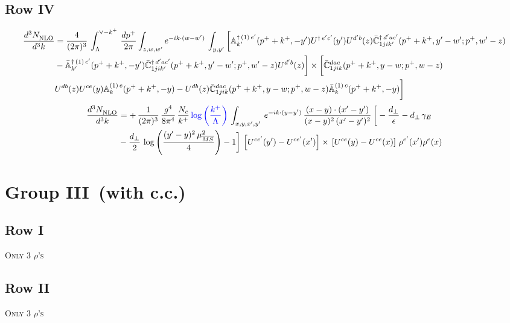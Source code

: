 \documentclass[9pt]{article}
\def\mf#1{\mathbb{#1}}
\numberwithin{equation}{section}
\begin{document}
\subsection{Row IV}
\begin{align}
    \frac{d^{3}N_{\rm NLO}^{\rm}}{d^{3}k}  & = \frac{4}{(2\pi)^{3}}\,\int_{\Lambda}^{\vee-k^{+}}\, \frac{dp^{+}}{2\pi}\int_{z,w,w^{\prime}} e^{-ik\cdot (w-w')}\,  \int_{y,y^{\prime}}\bigg[\mf{A}^{\dagger\, (1)\,e^{\prime}}_{k^{\prime}}(p^{+}+k^{+},-y^{\prime})U^{\dagger\, e^{\prime}c^{\prime}}(y^{\prime})U^{d^{\prime}b}(z) \Bar{\mf{C}}^{\dagger\, d^{\prime}ac^{\prime}}_{1jik^{\prime}}(p^{+}+k^{+},y^{\prime}-w^{\prime}; p^{+},w^{\prime}-z) \notag \\ &  -\Bar{\mf{A}}^{\dagger\, (1)\,c^{\prime}}_{k^{\prime}}(p^{+}+k^{+},-y^{\prime}) \Bar{\mf{C}}^{\dagger\, d^{\prime}ac^{\prime}}_{1jik^{\prime}}(p^{+}+k^{+},y^{\prime}-w^{\prime}; p^{+},w^{\prime}-z)U^{d^{\prime}b}(z)\bigg]\times\bigg[\Bar{\mf{C}}^{dac}_{1jik}(p^{+}+k^{+},y-w; p^{+},w-z)\notag \\ & U^{db}(z)U^{ce}(y) \mf{A}^{(1)\,e}_{k}(p^{+}+k^{+},-y) -U^{db}(z) \Bar{\mf{C}}^{dac}_{1jik}(p^{+}+k^{+},y-w; p^{+},w-z)\Bar{\mf{A}}^{(1)\,c}_{k}(p^{+}+k^{+},-y)\bigg]\nonumber
\end{align}
\begin{align}
    \frac{d^{3}N_{\rm NLO}^{\rm}}{d^{3}k}  & =  +\,\frac{1}{(2\pi)^{3}}\,\frac{g^{4}}{8\pi^{4}}\, \frac{N_{c}}{k^{+}}\,{\color{blue}\log{\left(\frac{k^{+}}{\Lambda}\right)}}\,\int_{x,y,x',y'}\,e^{-ik\cdot (y-y')}\,\frac{(x-y)\cdot (x'-y')}{(x-y)^{2}\,(x'-y')^{2}}\,\bigg[-\frac{d_{\perp}}{\epsilon}-d_{\perp}\,\gamma_{E}\notag \\ & -\frac{d_{\perp}}{2}\,\log{\left(\frac{(y'-y)^{2}\,\mu^{2}_{\overline{MS}}}{4}\right)}-1\bigg]\,\left[U^{ce'}(y') - U^{ce'}(x')\right] \times\, \left[U^{ce}(y) - U^{ce}(x)\right]\, \rho^{e'}(x') \rho^{e}(x)
\end{align}
\section{Group III\, (with c.c.)}
\subsection{Row I}
\textsc{Only 3 $\rho$'s}
\subsection{Row II}
\textsc{Only 3 $\rho$'s}
\end{document}
